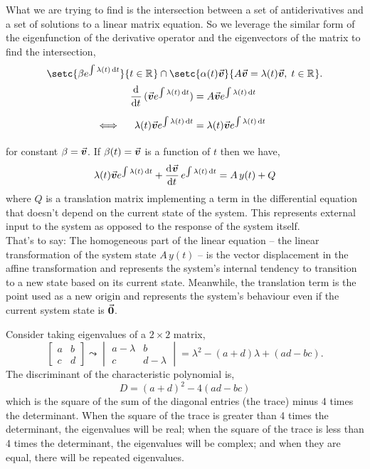 \documentclass[../MathsNotesBase.tex]{subfiles}
\begin{document}
{		\bigskip
		What we are trying to find is the intersection between a set of antiderivatives and a set of solutions to a linear matrix equation. So we leverage the similar form of the eigenfunction of the derivative operator and the eigenvectors of the matrix to find the intersection,
		\[ \setc{\beta e^{\int \lambda(t) \dif t}}{t \in \R{}} \cap \setc{\alpha(t)\v}{A\v = \lambda(t) \v,\; t \in \R{}}. \]
		\[\begin{aligned}
			&& \dod{}{t}(\v e^{\int \lambda(t) \dif t}) &= A\v e^{\int \lambda(t) \dif t} \nn
			&\iff & \lambda(t) \v e^{\int \lambda(t) \dif t} &= \lambda(t) \v e^{\int \lambda(t) \dif t} &\sidecomment{} \nn
		\end{aligned}\]
		for constant ${ \beta = \vec{\bm{v}} }$. If ${ \beta(t) = \vec{\bm{v}} }$ is a function of $t$ then we have,
		\[  \lambda(t) \v e^{\int \lambda(t) \dif t} + \dod{\v}{t} e^{\int \lambda(t) \dif t} = A\, y(t) + Q \]
		where $Q$ is a translation matrix implementing a term in the differential equation that doesn't depend on the current state of the system. This represents external input to the system as opposed to the response of the system itself.\\
		That's to say: The homogeneous part of the linear equation -- the linear transformation of the system state ${ A\, y(t) }$ -- is the vector displacement in the affine transformation and represents the system's internal tendency to transition to a new state based on its current state. Meanwhile, the translation term is the point used as a new origin and represents the system's behaviour even if the current system state is ${ \vec{\bm{0}} }$.\\
		
		\bigskip
		
		\biggerskip
		
		Consider taking eigenvalues of a ${ 2 \times 2 }$ matrix,
		\[ 	\begin{bmatrix}
				a & b\\
				c & d
			\end{bmatrix} \leadsto
			\begin{vmatrix}
				a-\lambda & b\\
				c & d-\lambda
			\end{vmatrix} = \lambda^2 - (a+d)\lambda + (ad - bc).
		\]
		The discriminant of the characteristic polynomial is,
		\[ D = (a+d)^2 - 4(ad - bc) \]
		which is the square of the sum of the diagonal entries (the trace) minus 4 times the determinant. When the square of the trace is greater than 4 times the determinant, the eigenvalues will be real; when the square of the trace is less than 4 times the determinant, the eigenvalues will be complex; and when they are equal, there will be repeated eigenvalues.\\
		
}
\end{document}
